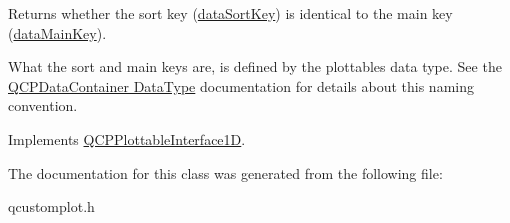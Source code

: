 Returns whether the sort key (\hyperlink{classQCPAbstractPlottable1D_aa8277da921b009bce474437d50b4a2d8}{data\+Sort\+Key}) is identical to the main key (\hyperlink{classQCPAbstractPlottable1D_aeb156ebf5d3c8de906b428be30733ad8}{data\+Main\+Key}).

What the sort and main keys are, is defined by the plottable\textquotesingle{}s data type. See the \hyperlink{classQCPDataContainer_qcpdatacontainer-datatype}{Q\+C\+P\+Data\+Container Data\+Type} documentation for details about this naming convention. 

Implements \hyperlink{classQCPPlottableInterface1D_a229e65e7ab968dd6cd0e259fa504b79d}{Q\+C\+P\+Plottable\+Interface1D}.



The documentation for this class was generated from the following file\+:\begin{DoxyCompactItemize}
\item 
qcustomplot.\+h\end{DoxyCompactItemize}
